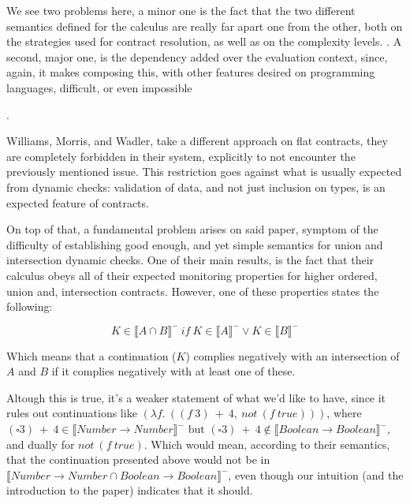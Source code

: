 \documentclass[sigplan,10pt,review,anonymous]{acmart}
\newcommand{\unsure}[2][1=]{}
\begin{document}
We see two problems here, a minor one is the fact that the two
different semantics defined for the calculus are really far apart
one from the other, both on the strategies used for contract resolution,
as well as on the complexity levels.
\unsure{(Yann) Is it really a
    problem per se? It is common thing to do (a nice declarative system
    for proofs and an algorithmic one for implementation, proved equivalent).
    Maybe the point is that the algorithmic system is way more complex than the
declarative one
(Teo) reworded}.
A second, major one,
is the dependency added over the evaluation context, since, again,
it makes composing this, with other features desired on programming languages,
difficult, or even impossible
\unsure{(Yann) I think we need to substantiate this claim. If this
context dependency explains why CSE is invalid, maybe have a little example?
(Teo) I removed it, I don't think there's an example, mainly since
this context dependency is not part of the language. I do think it complicates
implementation of said feature}
.

Williams, Morris, and Wadler, take a different approach on flat contracts,
they are completely forbidden in their system, explicitly to not encounter
the previously mentioned issue.
This restriction goes against what is usually expected from dynamic checks:
validation of data, and not just inclusion on types, is an expected
feature of contracts.

On top of that, a fundamental problem arises on said paper,
symptom of the difficulty of establishing good enough, and yet
simple semantics for union and intersection dynamic checks.
One of their main results, is the fact that their calculus obeys
all of their expected monitoring properties for higher ordered, union
and, intersection contracts.
However, one of these properties states the following:

$$ K \in \llbracket A \cap B \rrbracket^-~if~K \in \llbracket A \rrbracket^- \lor K \in \llbracket B \rrbracket^- $$

Which means that a continuation ($K$) complies negatively with an
intersection of $A$ and $B$ if it complies negatively with at least one of these.

Altough this is true, it's a weaker statement of what we'd like to have,
since it rules out continuations like $(\lambda f.~((f~3)~+~4,~not~(f ~ true)))$,
where $(\square 3)~+~4 \in \llbracket Number \rightarrow Number \rrbracket^-$
but $(\square 3)~+~4 \not \in \llbracket Boolean \rightarrow Boolean \rrbracket^-$,
and dually for $not~(f ~ true)$.
Which would mean, according to their semantics, that
the continuation presented above would not
be in $\llbracket Number \rightarrow Number \cap Boolean \rightarrow Boolean \rrbracket^-$,
even though our intuition (and the
introduction to the paper) indicates that it should.
\end{document}
